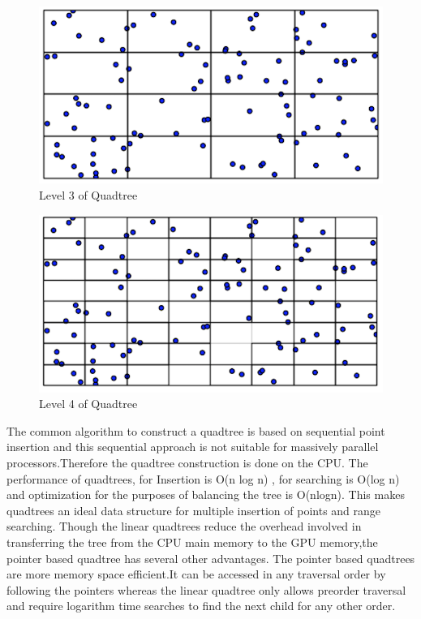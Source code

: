 \documentclass{article}
\begin{document}
  \begin{figure}[ht]
    \centering
\includegraphics[scale=0.5]{Quadtree_construction3}
\caption{Level 3 of Quadtree}
 \end{figure}
 
  \begin{figure}[ht]
    \centering
\includegraphics[scale=0.5]{Quadtree_construction4}
\caption{Level 4 of Quadtree}
 \end{figure}

\clearpage
The common algorithm to construct a quadtree is based on sequential point insertion and this sequential approach is not suitable for massively parallel processors.Therefore the quadtree construction is done on the CPU.
 The performance of quadtrees,  for Insertion is O(n log n) , for searching is O(log n) and optimization for the purposes of balancing the tree is O(nlogn). This makes quadtrees an ideal data structure for multiple insertion of points and range searching.
 Though the linear quadtrees reduce the overhead involved in transferring the tree from the CPU main memory to the GPU memory,the pointer based quadtree has several other advantages.
 The pointer based quadtrees are more memory space efficient.It can be accessed in any traversal order by  following the pointers whereas the linear quadtree only allows preorder traversal and require logarithm time searches to find the next child for any other order.
 
\end{document}
